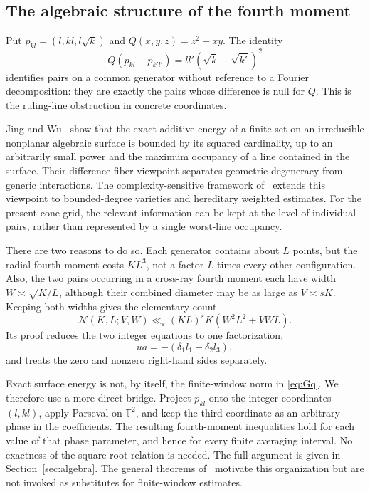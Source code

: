 \documentclass[11pt,reqno]{amsart}
\numberwithin{equation}{section}
\theoremstyle{definition}
\theoremstyle{remark}
\newcommand{\T}{\mathbb T}
\newcommand{\eps}{\varepsilon}
\begin{document}
\subsection{The algebraic structure of the fourth moment}
Put $p_{kl}=(l,kl,l\sqrt{k})$ and $Q(x,y,z)=z^2-xy$. The identity
\begin{equation}\label{eq:introconeidentity}
 Q(p_{kl}-p_{k'l'})=ll'(\sqrt{k}-\sqrt{k'})^2
\end{equation}
identifies pairs on a common generator without reference to a Fourier decomposition:
they are exactly the pairs whose difference is null for $Q$.
This is the ruling-line obstruction in concrete coordinates.

Jing and Wu~\cite[Theorem~1.1]{JW} show that the exact additive energy of a finite set on an
irreducible nonplanar algebraic surface is bounded by its squared cardinality, up to an
arbitrarily small power and the maximum occupancy of a line contained in the surface.
Their difference-fiber viewpoint separates geometric degeneracy from generic interactions.
The complexity-sensitive framework of~\cite[Theorem~1.1 and Proposition~5.1]{HuEnergy}
extends this viewpoint to bounded-degree varieties and hereditary weighted estimates.
For the present cone grid, the relevant information can be kept at the level of individual
pairs, rather than represented by a single worst-line occupancy.

There are two reasons to do so. Each generator contains about $L$ points, but the radial
fourth moment costs $KL^3$, not a factor $L$ times every other configuration.
Also, the two pairs occurring in a cross-ray fourth moment each have width
$W\asymp\sqrt{K/L}$, although their combined diameter may be as large as $V\asymp sK$.
Keeping both widths gives the elementary count
\begin{equation}\label{eq:paircountintro}
 \mathcal N(K,L;V,W)\ll_\eps (KL)^\eps K(W^2L^2+VWL).
\end{equation}
Its proof reduces the two integer equations to one factorization,
\[
 u a=-(\delta_1l_1+\delta_2l_3),
\]
and treats the zero and nonzero right-hand sides separately.

Exact surface energy is not, by itself, the finite-window norm in \eqref{eq:Gq}.
We therefore use a more direct bridge. Project $p_{kl}$ onto the integer coordinates
$(l,kl)$, apply Parseval on $\T^2$, and keep the third coordinate as an arbitrary phase in
the coefficients. The resulting fourth-moment inequalities hold for each value of that
phase parameter, and hence for every finite averaging interval. No exactness of the
square-root relation is needed. The full argument is given in Section~\ref{sec:algebra}.
The general theorems of~\cite{JW,HuEnergy} motivate this organization but are not invoked
as substitutes for finite-window estimates.
\end{document}
